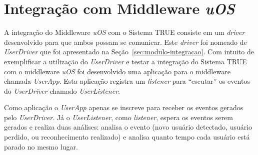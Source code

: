 \section{Integração com Middleware \textit{uOS}}

	A integração do Middleware \textit{uOS} com o Sistema TRUE consiste em um \textit{driver} desenvolvido para que ambos possam se comunicar. Este \textit{driver} foi nomeado de \textit{UserDriver} que foi apresentado na Seção~\ref{sec:modulo-integracao}. Com intuito de exemplificar a utilização do \textit{UserDriver} e testar a integração do Sistema TRUE com o middleware \textit{uOS} foi desenvolvido uma aplicação para o middleware chamada \textit{UserApp}. Esta aplicação registra um \textit{listener} para ``escutar'' os eventos do \textit{UserDriver} chamado \textit{UserListener}. 

	Como aplicação o \textit{UserApp} apenas se inscreve para receber os eventos gerados pelo \textit{UserDriver}. Já o \textit{UserListener}, como \textit{listener}, espera os eventos serem gerados e realiza duas análises: analisa o evento (novo usuário detectado, usuário perdido, ou reconhecimento realizado) e analisa quanto tempo cada usuário está parado no mesmo lugar.





